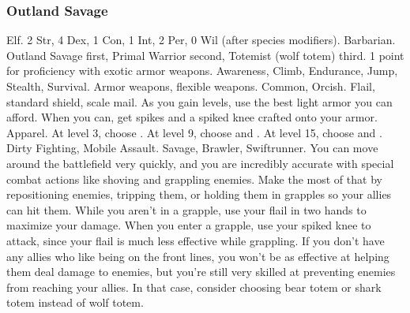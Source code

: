         \subsubsection{Outland Savage}
             Elf.
             2 Str, 4 Dex, 1 Con, 1 Int, 2 Per, 0 Wil (after species modifiers).
             Barbarian.
             Outland Savage first, Primal Warrior second, Totemist (wolf totem) third.
             1 point for proficiency with exotic armor weapons.
             Awareness, Climb, Endurance, Jump, Stealth, Survival.
             Armor weapons, flexible weapons.
             Common, Orcish.
             Flail, standard shield, scale mail. As you gain levels, use the best light armor you can afford. When you can, get spikes and a spiked knee crafted onto your armor.
             Apparel.
                At level 3, choose .
                At level 9, choose  and .
                At level 15, choose  and .
             Dirty Fighting, Mobile Assault.
             Savage, Brawler, Swiftrunner.
             You can move around the battlefield very quickly, and you are incredibly accurate with special combat actions like shoving and grappling enemies.
            Make the most of that by repositioning enemies, tripping them, or holding them in grapples so your allies can hit them.
            While you aren't in a grapple, use your flail in two hands to maximize your damage.
            When you enter a grapple, use your spiked knee to attack, since your flail is much less effective while grappling.
            If you don't have any allies who like being on the front lines, you won't be as effective at helping them deal damage to enemies, but you're still very skilled at preventing enemies from reaching your allies.
            In that case, consider choosing bear totem or shark totem instead of wolf totem.

